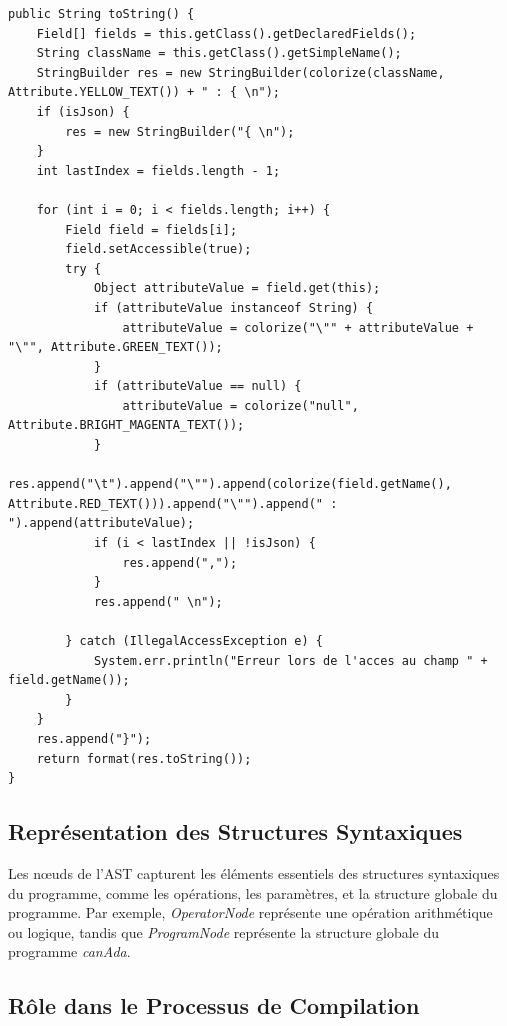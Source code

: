 \documentclass[french,a4paper]{article}
\begin{document}
    \begin{lstlisting}[label={lst:lstlisting14}]
public String toString() {
    Field[] fields = this.getClass().getDeclaredFields();
    String className = this.getClass().getSimpleName();
    StringBuilder res = new StringBuilder(colorize(className, Attribute.YELLOW_TEXT()) + " : { \n");
    if (isJson) {
        res = new StringBuilder("{ \n");
    }
    int lastIndex = fields.length - 1;

    for (int i = 0; i < fields.length; i++) {
        Field field = fields[i];
        field.setAccessible(true);
        try {
            Object attributeValue = field.get(this);
            if (attributeValue instanceof String) {
                attributeValue = colorize("\"" + attributeValue + "\"", Attribute.GREEN_TEXT());
            }
            if (attributeValue == null) {
                attributeValue = colorize("null", Attribute.BRIGHT_MAGENTA_TEXT());
            }
            res.append("\t").append("\"").append(colorize(field.getName(), Attribute.RED_TEXT())).append("\"").append(" : ").append(attributeValue);
            if (i < lastIndex || !isJson) {
                res.append(",");
            }
            res.append(" \n");

        } catch (IllegalAccessException e) {
            System.err.println("Erreur lors de l'acces au champ " + field.getName());
        }
    }
    res.append("}");
    return format(res.toString());
}
    \end{lstlisting}

    \subsection{Représentation des Structures Syntaxiques}\label{subsec:representation-des-structures-syntaxiques}

    Les nœuds de l'AST capturent les éléments essentiels des structures syntaxiques du programme, comme les opérations, les paramètres, et la structure globale du programme.
    Par exemple, \textit{OperatorNode} représente une opération arithmétique ou logique, tandis que \textit{ProgramNode} représente la structure globale du programme \textit{canAda}.

    \subsection{Rôle dans le Processus de Compilation}\label{subsec:role-dans-le-processus-de-compilation}
\end{document}
